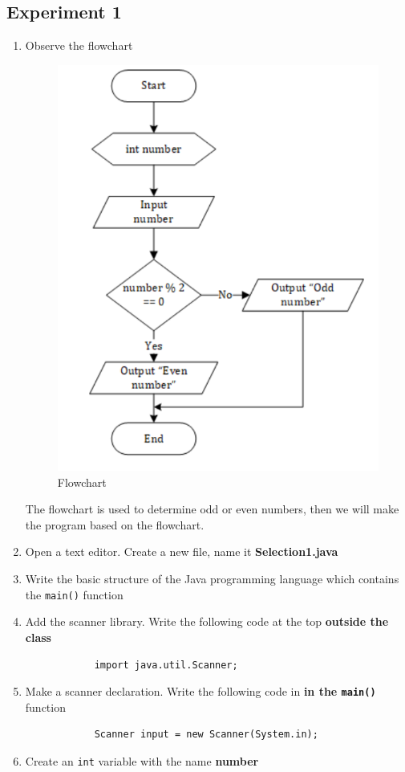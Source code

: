 \documentclass[12pt,titlepage]{article}
\begin{document}
\subsection{Experiment 1}
\begin{enumerate}
    \item {
        Observe the flowchart

        \begin{figure}[h]
            \centering
            \includegraphics[width=.6\textwidth]{./images/flowchart-1.png}
            \caption{Flowchart}
        \end{figure}

        The flowchart is used to determine odd or even numbers, then we will make the program based on the flowchart.
    }
    \item Open a text editor. Create a new file, name it \textbf{Selection1.java}
    \item Write the basic structure of the Java programming language which contains the \texttt{main()} function
    \item {
        Add the scanner library. Write the following code at the top \textbf{outside the class}

        \begin{verbatim}
            import java.util.Scanner;
        \end{verbatim}
    }
    \item {
        Make a scanner declaration. Write the following code in \textbf{in the \texttt{main()}} function

        \begin{verbatim}
            Scanner input = new Scanner(System.in);
        \end{verbatim}
    }
    \item {
        Create an \texttt{int} variable with the name \textbf{number}

}
\end{enumerate}
\end{document}
